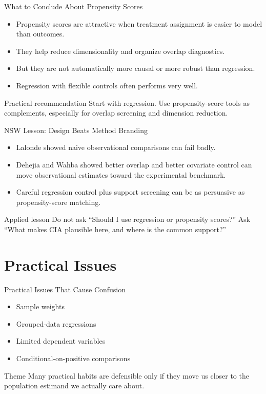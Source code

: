 \documentclass[11pt,aspectratio=169]{beamer}
\begin{document}
\begin{frame}{What to Conclude About Propensity Scores}
  \begin{itemize}
    \item Propensity scores are attractive when treatment assignment is easier to model than outcomes.
    \item They help reduce dimensionality and organize overlap diagnostics.
    \item But they are not automatically more causal or more robust than regression.
    \item Regression with flexible controls often performs very well.
  \end{itemize}
  \begin{block}{Practical recommendation}
    Start with regression. Use propensity-score tools as complements, especially for overlap screening and dimension reduction.
  \end{block}
\end{frame}

\begin{frame}{NSW Lesson: Design Beats Method Branding}
  \begin{itemize}
    \item Lalonde showed naive observational comparisons can fail badly.
    \item Dehejia and Wahba showed better overlap and better covariate control can move observational estimates toward the experimental benchmark.
    \item Careful regression control plus support screening can be as persuasive as propensity-score matching.
  \end{itemize}
  \begin{block}{Applied lesson}
    Do not ask ``Should I use regression or propensity scores?'' Ask ``What makes CIA plausible here, and where is the common support?''
  \end{block}
\end{frame}

\section{Practical Issues}

\begin{frame}{Practical Issues That Cause Confusion}
  \begin{itemize}
    \item Sample weights
    \item Grouped-data regressions
    \item Limited dependent variables
    \item Conditional-on-positive comparisons
  \end{itemize}
  \begin{block}{Theme}
    Many practical habits are defensible only if they move us closer to the population estimand we actually care about.
  \end{block}
\end{frame}
\end{document}
